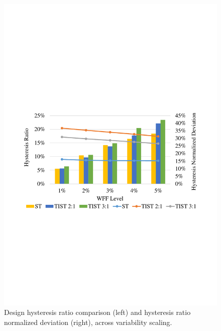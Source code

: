 \documentclass[pgmicro,mestrado,english]{iiufrgs}
\begin{document}
    \begin{figure}[]
        \centering
            \includegraphics[width=1\textwidth, trim={1.25cm 9cm 2cm 10cm}, clip]{hystWFFComp.pdf}
            \caption{Design hysteresis ratio comparison (left) and hysteresis ratio normalized deviation (right), across variability scaling.}
        \label{figsHystComp}
    \end{figure}
\end{document}
